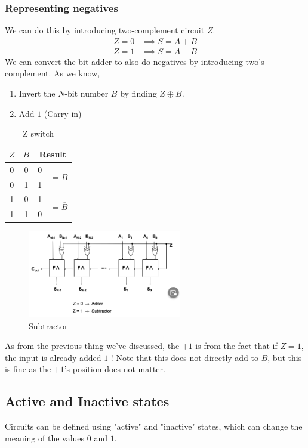 \documentclass[a4paper]{article}
\theoremstyle{plain}
\theoremstyle{definition}
\theoremstyle{remark}
\begin{document}
\subsubsection{Representing negatives}
We can do this by introducing two-complement circuit $Z$. \\
\begin{align*}
	Z = 0 &\implies S = A + B \\
	Z = 1 &\implies S = A - B 
\end{align*}
We can convert the bit adder to also do negatives by introducing two's complement. As we know,
\begin{enumerate}
	\item Invert the $N$-bit number $B$ by finding $Z \oplus B$.
	\item Add $1$ (Carry in)
\end{enumerate}
\begin{table}[H]
	\centering
	\caption{Z switch}
	\label{tab:Z}
	\begin{tabular}{cc|cc}
	$Z$& $B$ & \multicolumn{2}{c}{Result} \\
	 \hline
	 0 & 0 & 0 & \multirow{2}{*}{$=B$}\\
	 0 & 1 & 1 \\
	 \hline
	 1 & 0 & 1 & \multirow{2}{*}{$=\overline{B}$} \\
	 1 & 1 & 0 \\
	 \hline
	\end{tabular}
\end{table}
\begin{figure}[H]
	\centering
	\includegraphics[width=0.6\textwidth]{figures/subtractor.png}
	\caption{Subtractor}
	\label{fig:figures-subtractor-png}
\end{figure}
As from the previous thing we've discussed, the $+1$ is from the fact that if $Z=1 $, the input is already added $1$ ! Note that this does not directly add to $B$, but this is fine as the $+1$'s position does not matter. 
\subsection{Active and Inactive states}
Circuits can be defined using "active" and "inactive" states, which can change the meaning of the values $0$ and $1$. 
\end{document}
